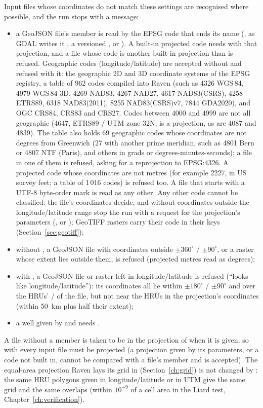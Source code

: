 Input files whose coordinates do not match these settings are recognised where possible, and the run stops with a message:
\begin{itemize}
\item a GeoJSON file's  member is read by the EPSG code that ends its name (, as GDAL writes it
, a versioned , or
). A built-in projected code needs  with that projection,
and a file whose code is another built-in projection than  is refused. Geographic codes (longitude/latitude)
are accepted without  and refused with it: the geographic 2D and 3D coordinate systems of the EPSG
registry, a table of 962 codes compiled into Raven (such as 4326 WGS\,84, 4979 WGS\,84 3D, 4269 NAD83, 4267 NAD27, 4617
NAD83(CSRS), 4258 ETRS89, 6318 NAD83(2011), 8255 NAD83(CSRS)v7, 7844 GDA2020), and OGC CRS84, CRS83 and CRS27. Codes
between 4000 and 4999 are not all geographic (4647, ETRS89 / UTM zone 32N, is a projection, as are 4087 and 4839). The
table also holds 69 geographic codes whose coordinates are not degrees from Greenwich (27 with another prime meridian,
such as 4801 Bern or 4807 NTF (Paris), and others in grads or degrees-minutes-seconds); a file in one of them is refused,
asking for a reprojection to EPSG:4326. A projected code whose coordinates are not metres (for example 2227, in US survey
feet; a table of 1\,016 codes) is refused too. A file that starts with a UTF-8 byte-order mark is read as any other. Any
other code cannot be classified: the file's coordinates decide, and without  coordinates outside the
longitude/latitude range stop the run with a request for the projection's parameters (,  or
); GeoTIFF rasters carry their code in their keys (Section~\ref{sec:geotiff});
\item without , a GeoJSON file with coordinates outside $\pm360^\circ$ / $\pm90^\circ$, or a raster whose
extent lies outside them, is refused (projected metres read as degrees);
\item with , a GeoJSON file or raster left in longitude/latitude is refused (``looks like
longitude/latitude''): its coordinates all lie within $\pm180^\circ$ / $\pm90^\circ$ and over the HRUs'
/ of the  file, but not near the HRUs in the projection's coordinates (within
50~km plus half their extent);
\item a well given by  and  needs .
\end{itemize}
A file without a  member is taken to be in the projection of  when it is given, so with
 every input file must be projected (a projection given by its parameters, or a code not built in, cannot be
compared with a file's  member and is accepted). The equal-area projection Raven lays its grid in
(Section~\ref{ch:grid}) is not changed by : the same HRU polygons given in longitude/latitude or in UTM give
the same grid and the same overlaps (within $10^{-9}$ of a cell area in the Liard test, Chapter~\ref{ch:verification}).
